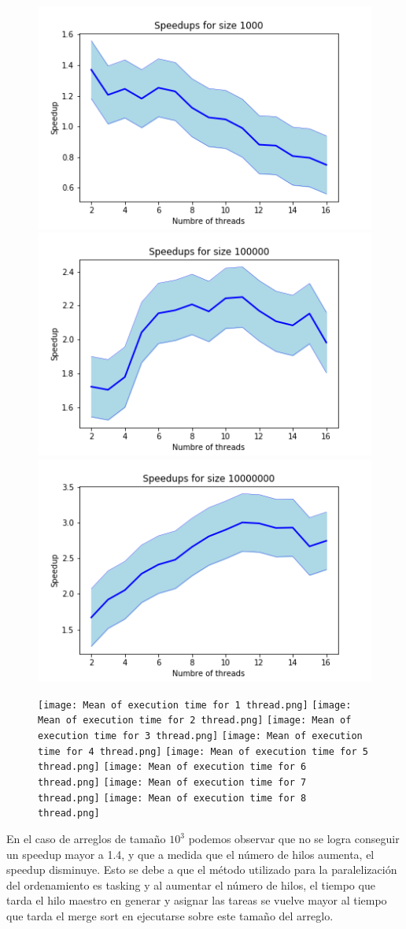 \documentclass[a4paper,12pt]{article}
\begin{document}
    \begin{figure}[ht]
        \centering
        \includegraphics[width =0.55\linewidth]{Speedups for size 1000.png}
        \includegraphics[width =0.55\linewidth]{Speedups for size 100000.png}
        \includegraphics[width =0.55\linewidth]{Speedups for size 10000000.png}
    \end{figure}
    
    \begin{figure}[ht]
    \centering
        \texttt{[image: Mean of execution time for 1 thread.png]}
        \texttt{[image: Mean of execution time for 2 thread.png]}
        \texttt{[image: Mean of      execution time for 3         thread.png]}
        \texttt{[image: Mean of execution time for 4 thread.png]}
        \texttt{[image: Mean of      execution time for 5         thread.png]}
        \texttt{[image: Mean of execution time for 6 thread.png]}
        \texttt{[image: Mean of      execution time for 7         thread.png]}
        \texttt{[image: Mean of execution time for 8 thread.png]}
    \end{figure}
    En el caso de arreglos de tamaño $10^3$ podemos observar que no se logra conseguir un speedup mayor a 1.4, y que a medida que el número de hilos aumenta, el speedup disminuye. Esto se debe a que el método utilizado para la paralelización del ordenamiento es tasking y al aumentar el número de hilos, el tiempo que tarda el hilo maestro en generar y asignar las tareas se vuelve mayor al tiempo que tarda el merge sort en ejecutarse sobre este tamaño del arreglo.
    
\end{document}
